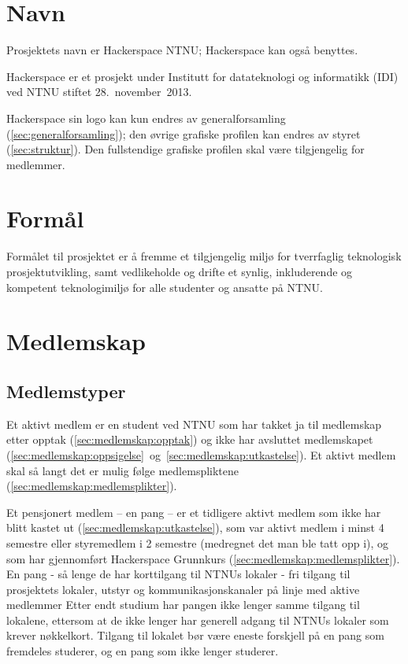 \section{Navn}\label{sec:navn}
Prosjektets navn er Hackerspace NTNU; Hackerspace kan også benyttes.

Hackerspace er et prosjekt under Institutt for datateknologi og informatikk (IDI) ved NTNU stiftet 28.~november~2013.

Hackerspace sin logo kan kun endres av generalforsamling (\ref{sec:generalforsamling}); den øvrige grafiske profilen kan endres av styret (\ref{sec:struktur}). Den fullstendige grafiske profilen skal være tilgjengelig for medlemmer.


\section{Formål}\label{sec:formål}
Formålet til prosjektet er å fremme et tilgjengelig miljø for tverrfaglig teknologisk prosjektutvikling, samt vedlikeholde og drifte et synlig, inkluderende og kompetent teknologimiljø for alle studenter og ansatte på NTNU.\@


\section{Medlemskap}\label{sec:medlemskap}
\subsection{Medlemstyper}\label{sec:medlemskap:medlemstyper}
Et aktivt medlem er en student ved NTNU som har takket ja til medlemskap etter opptak (\ref{sec:medlemskap:opptak}) og ikke har avsluttet medlemskapet (\ref{sec:medlemskap:oppsigelse}~og~\ref{sec:medlemskap:utkastelse}).
Et aktivt medlem skal så langt det er mulig følge medlemspliktene (\ref{sec:medlemskap:medlemsplikter}).

Et pensjonert medlem -- en pang -- er et tidligere aktivt medlem som ikke har blitt kastet ut (\ref{sec:medlemskap:utkastelse}), som var aktivt medlem i minst 4 semestre eller styremedlem i 2 semestre (medregnet det man ble tatt opp i), og som har gjennomført Hackerspace Grunnkurs (\ref{sec:medlemskap:medlemsplikter}).
En pang - så lenge de har korttilgang til NTNUs lokaler - fri tilgang til prosjektets lokaler, utstyr og kommunikasjonskanaler på linje med aktive medlemmer
Etter endt studium har pangen ikke lenger samme tilgang til lokalene, ettersom at de ikke lenger har generell adgang til NTNUs lokaler som krever nøkkelkort. Tilgang til lokalet bør være eneste forskjell på en pang som fremdeles studerer, og en pang som ikke lenger studerer.

